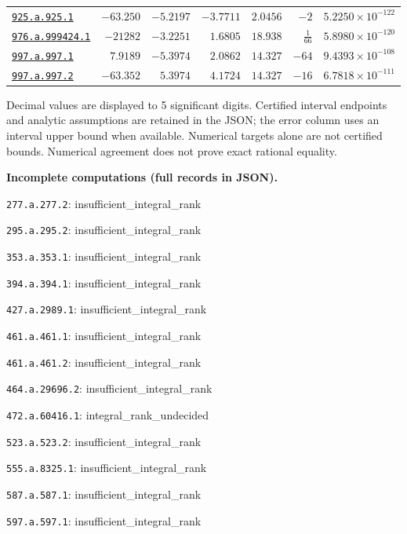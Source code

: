 \documentclass[10pt]{article}
\begin{document}
\begin{landscape}
\begin{longtable}{@{}lrrrrrr@{}}
\href{https://www.lmfdb.org/Genus2Curve/Q/925/a/925/1}{\texttt{925.a.925.1}} & $-63.250$ & $-5.2197$ & $-3.7711$ & $2.0456$ & $-2$ & $5.2250\times 10^{-122}$ \\
\href{https://www.lmfdb.org/Genus2Curve/Q/976/a/999424/1}{\texttt{976.a.999424.1}} & $-21282$ & $-3.2251$ & $1.6805$ & $18.938$ & $\frac{1}{66}$ & $5.8980\times 10^{-120}$ \\
\href{https://www.lmfdb.org/Genus2Curve/Q/997/a/997/1}{\texttt{997.a.997.1}} & $7.9189$ & $-5.3974$ & $2.0862$ & $14.327$ & $-64$ & $9.4393\times 10^{-108}$ \\
\href{https://www.lmfdb.org/Genus2Curve/Q/997/a/997/2}{\texttt{997.a.997.2}} & $-63.352$ & $5.3974$ & $4.1724$ & $14.327$ & $-16$ & $6.7818\times 10^{-111}$ \\
\end{longtable}
\noindent Decimal values are displayed to 5 significant digits.
Certified interval endpoints and analytic assumptions are retained in the JSON;
the error column uses an interval upper bound when available. Numerical targets alone are not certified bounds.
Numerical agreement does not prove exact rational equality.
\par\noindent\textbf{Incomplete computations (full records in JSON).}
\par\noindent\texttt{277.a.277.2}: insufficient\_integral\_rank
\par\noindent\texttt{295.a.295.2}: insufficient\_integral\_rank
\par\noindent\texttt{353.a.353.1}: insufficient\_integral\_rank
\par\noindent\texttt{394.a.394.1}: insufficient\_integral\_rank
\par\noindent\texttt{427.a.2989.1}: insufficient\_integral\_rank
\par\noindent\texttt{461.a.461.1}: insufficient\_integral\_rank
\par\noindent\texttt{461.a.461.2}: insufficient\_integral\_rank
\par\noindent\texttt{464.a.29696.2}: insufficient\_integral\_rank
\par\noindent\texttt{472.a.60416.1}: integral\_rank\_undecided
\par\noindent\texttt{523.a.523.2}: insufficient\_integral\_rank
\par\noindent\texttt{555.a.8325.1}: insufficient\_integral\_rank
\par\noindent\texttt{587.a.587.1}: insufficient\_integral\_rank
\par\noindent\texttt{597.a.597.1}: insufficient\_integral\_rank

\end{landscape}
\end{document}
